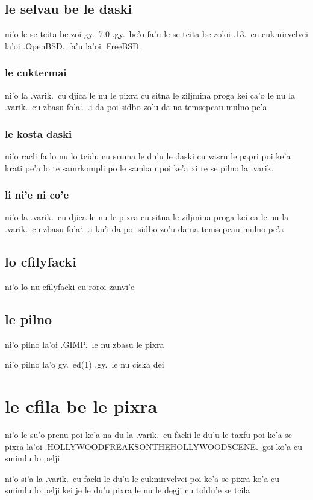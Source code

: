 \documentclass{report}
\newcommand\sds{\spacefactor\sfcode`.\ \space}
\begin{document}
\subsection{le selvau be le daski}
ni'o le se tcita be zoi gy.\ 7.0 .gy.\ be'o fa'u le se tcita be zo'oi .13.\ cu cukmirvelvei la'oi .OpenBSD.\ fa'u la'oi .FreeBSD.

\subsubsection{le cuktermai}
ni'o la .varik.\ cu djica le nu le pixra cu sitna le ziljmina proga kei ca'o le nu la .varik.\ cu zbasu fo'a\sds  .i da poi sidbo zo'u da na temsepcau mulno pe'a

\subsubsection{le kosta daski}
ni'o racli fa lo nu lo tcidu cu sruma le du'u le daski cu vasru le papri poi ke'a krati pe'a lo te samrkompli po le sambau poi ke'a xi re se pilno la .varik.

\subsubsection{li ni'e ni co'e}
ni'o la .varik.\ cu djica le nu le pixra cu sitna le ziljmina proga kei ca le nu la .varik.\ cu zbasu fo'a\sds  .i ku'i da poi sidbo zo'u da na temsepcau mulno pe'a

\subsection{lo cfilyfacki}
ni'o lo nu cfilyfacki cu roroi zanvi'e

\subsection{le pilno}
ni'o pilno la'oi .GIMP.\ le nu zbasu le pixra

ni'o pilno la'o gy.\ ed(1) .gy.\ le nu ciska dei

\section{le cfila be le pixra}
ni'o le su'o prenu poi ke'a na du la .varik.\ cu facki le du'u le taxfu poi ke'a se pixra la'oi .HOLLYWOODFREAKSONTHEHOLLYWOODSCENE.\ goi ko'a cu smimlu lo pelji

ni'o si'a la .varik.\ cu facki le du'u le cukmirvelvei poi ke'a se pixra ko'a cu smimlu lo pelji kei je le du'u pixra le nu le degji cu toldu'e se tcila
\end{document}
